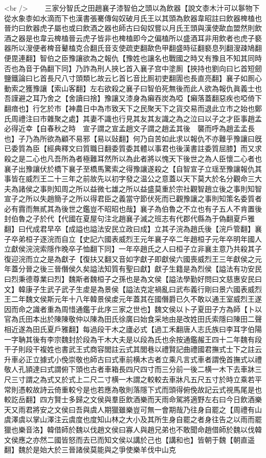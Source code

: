 <br />
　　三家分智氏之田趙襄子漆智伯之頭以為飲器【說文桼木汁可以鬖物下從水象桼如水滴而下也漢書張騫傳匈奴破月氏王以其頭為飲器韋昭註曰飲器椑榼也晉灼曰飲器虎子屬也或曰飲酒之器也師古曰匈奴嘗以月氏王頭與漢使歃血盟然則飲酒之器是也韋云椑榼晉云虎子皆非也椑榼即今之偏榼所以盛酒耳非用飲者也虎子褻器所以溲便者椑音鼙榼克合翻氏音支使疏吏翻歃色甲翻盛時征翻褻息列翻溲疎鳩翻便毘連翻】智伯之臣豫讓欲為之報仇【豫姓也讓名也戰國之時又有豫且不知其同時否也為音于偽翻下同】乃詐為刑人挾匕首入襄子宫中塗厠【挾持也劉向曰匕首短劒鹽鐵論曰匕首長尺八寸頭類匕故云匕首匕音比厠初吏翻圊也長直亮翻】襄子如厠心動索之獲豫讓【索山客翻】左右欲殺之襄子曰智伯死無後而此人欲為報仇眞義士也吾謹避之耳乃舍之【舍讀曰捨】豫讓又漆身為癩吞炭為啞【癩落蓋翻惡疾也啞倚下翻瘖也】行乞於市【神農日中為市致天下之民聚天下之貨交易而退此立市之始也鄭氏周禮注曰市雜聚之處】其妻不識也行見其友其友識之為之泣曰以子之才臣事趙孟必得近幸【自春秋之時　宣子謂之宣孟趙文子謂之趙孟其後　襲而呼為趙孟孟長也】子乃為所欲為顧不易邪【易以䜴翻】何乃自苦如此求以報仇不亦難乎豫讓曰旣已委質為臣【經典釋文曰質職日翻委質委其體以事君也後漢書註委質屈膝】而又求殺之是二心也凡吾所為者極難耳然所以為此者將以愧天下後世之為人臣懷二心者也襄子出豫讓伏於橋下襄子至橋馬驚索之得豫讓遂殺之【自智宣子立瑶至豫讓報仇其事皆在威烈王二十三年之前故先以初字發之温公之意蓋以天下莫大於名分觀命三大夫為諸侯之事則知周之所以益微七雄之所以益盛莫重於宗社觀智趙立後之事則知智宣子之所以失趙簡子之所以得君臣之義當守節伏死而已觀豫讓之事則知策名委質者必有霣而無貳其為後世之鑑豈不昭昭也哉】襄子為伯魯之不立也有子五人不肯置後封伯魯之子於代【代國在夏屋句注北趙襄子滅之班志有代郡代縣為于偽翻夏戶雅翻】曰代成君早卒【成謚也謚法安民立政曰成】立其子浣為趙氏後【浣戶管翻】襄子卒弟桓子逐浣而自立【史記六國表威烈王元年襄子卒二年趙桓子元年卒明年國人立獻侯浣浣索隱作晚卒子恤翻下同】一年卒趙氏之人曰桓子立非襄主意乃共殺其子復迎浣而立之是為獻子【復扶又翻又音如字獻子即獻侯六國喪威烈王三年獻侯之元年蓋分晉之後三晉僭侯久矣謚法知質有聖曰獻】獻子生籍是為烈侯【謚法有功安民曰烈秉德尊業曰烈】魏斯者魏桓子之孫也是為文侯【謚法學勤好問曰文慈惠安民曰文】韓康子生武子武子生䖍是為景侯【謚法克定禍亂曰武布義行剛曰景六國表威烈王二年魏文侯斯元年十八年韓景侯䖍元年蓋其在國僭爵已久不敢以通王室威烈王遂因而命之識者重為周惜通鑑于此序三家之世也】魏文侯以卜子夏田子方為師【卜以官為氏田本出於陳陳敬仲以陳為田氏徐廣曰始食采地由是改姓田氏索隱曰陳田二聲相近遂為田氏夏戶雅翻】每過段干木之廬必式【過工禾翻唐人志氏族曰李耳字伯陽一字聃其後有李宗魏封於段為干木大夫是以段為氏也余按通鑑赧王四十二年魏有段干子則段干複姓也書武王式商容閭註云式其閭巷以禮賢記曲禮國君撫式士下之註云升車必正立據式小俛崇敬也師古曰式車前横木古者立乘凡言式車者謂俛首撫式以禮敬人孔頴達曰式謂俯下頭也古者車箱長四尺四寸而三分前一後二横一木下去車牀三尺三寸謂之為式又於式上二尺二寸横一木謂之較較去車牀凡五尺五寸於時立乘若平常則憑較故詩云倚重較兮是也若應為敬則落隱下式而頭得俯俛故記云式視馬尾是也較訖岳翻】四方賢士多歸之文侯與羣臣飲酒樂而天雨命駕將適野左右曰今日飲酒樂天又雨君將安之文侯曰吾與虞人期獵雖樂豈可無一會期哉乃往身自罷之【周禮有山虞澤虞以掌山澤注云虞度也度知山林之大小及其所生身自罷之者身往告之以雨而罷獵也樂音洛】韓借師於魏以伐趙文侯曰寡人與趙兄弟也不敢聞命趙借師於魏以伐韓文侯應之亦然二國皆怒而去已而知文侯以講於己也【講和也】皆朝于魏【朝直遥翻】魏於是始大於三晉諸侯莫能與之爭使樂羊伐中山克